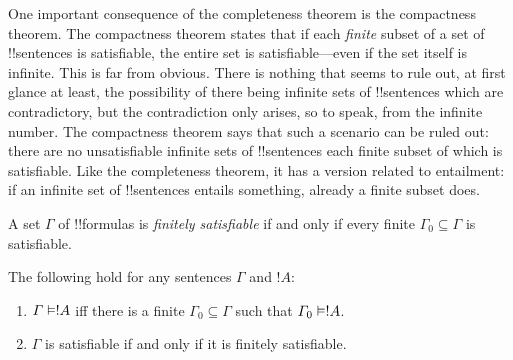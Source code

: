 \documentclass[../../../include/open-logic-section]{subfiles}
\begin{document}
      {}
      {}


One important consequence of the completeness theorem is the
compactness theorem.  The compactness theorem states that if each
\emph{finite} subset of a set of !!{sentence}s is satisfiable, the
entire set is satisfiable---even if the set itself is infinite. This
is far from obvious. There is nothing that seems to rule out, at first
glance at least, the possibility of there being infinite sets of
!!{sentence}s which are contradictory, but the contradiction only
arises, so to speak, from the infinite number.  The compactness
theorem says that such a scenario can be ruled out: there are no
unsatisfiable infinite sets of !!{sentence}s each finite subset of
which is satisfiable. Like the completeness theorem, it has a version
related to entailment: if an infinite set of !!{sentence}s entails
something, already a finite subset does.

\begin{defn}
  A set $\Gamma$ of !!{formula}s is \emph{finitely satisfiable} if and
  only if every finite $\Gamma_0 \subseteq \Gamma$ is satisfiable.
\end{defn}

\begin{thm}
The following hold for any sentences $\Gamma$ and $!A$:
\begin{enumerate}
  \item $\Gamma \Entails !A$ iff there is a finite $\Gamma_0
    \subseteq \Gamma$ such that $\Gamma_0 \Entails !A$.
  \item $\Gamma$ is satisfiable if and only if it is finitely
    satisfiable.
\end{enumerate}
\end{thm}
\end{document}
